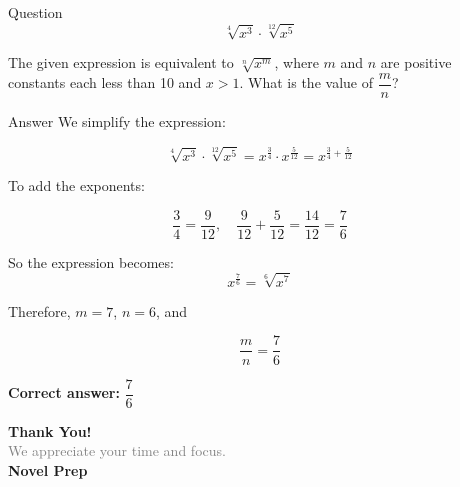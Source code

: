 \documentclass{beamer}
\begin{document}
\begin{frame}{Question}
\[
\sqrt[4]{x^3} \cdot \sqrt[12]{x^5}
\]

The given expression is equivalent to $\sqrt[n]{x^m}$, where $m$ and $n$ are positive constants each less than 10 and $x > 1$. What is the value of $\dfrac{m}{n}$?
\end{frame}


\begin{frame}{Answer}
We simplify the expression:

\[
\sqrt[4]{x^3} \cdot \sqrt[12]{x^5} = x^{\frac{3}{4}} \cdot x^{\frac{5}{12}} = x^{\frac{3}{4} + \frac{5}{12}}
\]

To add the exponents:

\[
\frac{3}{4} = \frac{9}{12}, \quad \frac{9}{12} + \frac{5}{12} = \frac{14}{12} = \frac{7}{6}
\]

So the expression becomes:
\[
x^{\frac{7}{6}} = \sqrt[6]{x^7}
\]

Therefore, $m = 7$, $n = 6$, and

\[
\frac{m}{n} = \frac{7}{6}
\]

\textbf{Correct answer:} $\dfrac{7}{6}$
\end{frame}


















\begin{frame}{}

    \centering
    \vspace{5em}

    {\Huge \textbf{\textcolor{novelPurple}{Thank You!}}} \\[1em]
    {\large \textcolor{gray}{We appreciate your time and focus.}} \\[3em]

    {\LARGE \textbf{\textcolor{novelPurple}{\textsf{Novel Prep}}}}

    \vfill
\end{frame}
\end{document}
